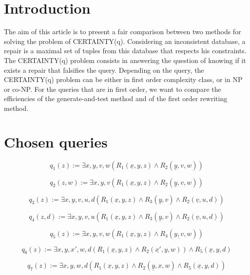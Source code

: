 
\section{Introduction}
The aim of this article is to present a fair comparison between two methods for solving the problem of CERTAINTY(q). Considering an inconsistent database, a repair is a maximal set of tuples from this database that respects his constraints. The CERTAINTY(q) problem consists in answering the question of knowing if it exists a repair that falsifies the query. Depending on the query, the CERTAINTY(q) problem can be either in first order complexity class, or in NP or co-NP. For the queries that are in first order, we want to compare the efficiencies of the generate-and-test method and of the first order rewriting method. 



\section{Chosen queries}

$$q_1(z) := \exists x, y, v, w (R_1(\underline{x},y,z) \wedge R_2(\underline{y}, v, w)) $$

$$q_2(z,w) :=  \exists x, y, v (R_1(\underline{x},y,z) \wedge R_2(\underline{y}, v, w)) $$

$$q_3(z) :=  \exists x, y, v, u, d (R_1(\underline{x},y,z) \wedge R_3(\underline{y}, v) \wedge R_2(\underline{v}, u,d)) $$

$$q_4(z,d) :=  \exists x, y, v, u (R_1(\underline{x},y,z) \wedge R_3(\underline{y}, v)\wedge R_2(\underline{v}, u, d)) $$

$$q_5(z) := \exists x, y, v, w (R_1(\underline{x},y,z) \wedge R_4(\underline{y, v},w)) $$

$$q_6(z) := \exists x, y, x', w, d (R_1(\underline{x},y,z) \wedge R_2(\underline{x'},y,w))
\wedge R_5(\underline{x},y,d) $$

$$q_7(z) := \exists x, y, w, d (R_1(\underline{x},y,z)
\wedge R_2(\underline{y},x,w) \wedge R_5(\underline{x},y,d)) $$

